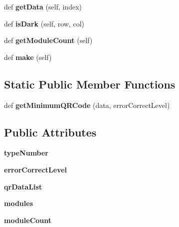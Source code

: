 \begin{DoxyCompactItemize}
def {\bfseries get\+Data} (self, index)
\item 
\mbox{\label{classqrcode_1_1_q_r_code_a6c3313700ec8fdbf1ca23549dfb6ed9f}} 
def {\bfseries is\+Dark} (self, row, col)
\item 
\mbox{\label{classqrcode_1_1_q_r_code_a30c08c963f098de1d0207755cc9e9896}} 
def {\bfseries get\+Module\+Count} (self)
\item 
\mbox{\label{classqrcode_1_1_q_r_code_af791f3139b72e1cf1dd91e3746000dd0}} 
def {\bfseries make} (self)
\end{DoxyCompactItemize}
\subsection*{Static Public Member Functions}
\begin{DoxyCompactItemize}
\item 
\mbox{\label{classqrcode_1_1_q_r_code_ac1f4af4e23403fd8f0aed43936f22b8f}} 
def {\bfseries get\+Minimum\+Q\+R\+Code} (data, error\+Correct\+Level)
\end{DoxyCompactItemize}
\subsection*{Public Attributes}
\begin{DoxyCompactItemize}
\item 
\mbox{\label{classqrcode_1_1_q_r_code_afe8d0bd0ca793d67dda14f37ae5d09dc}} 
{\bfseries type\+Number}
\item 
\mbox{\label{classqrcode_1_1_q_r_code_a50ad3a645e8734d949c8843508329e15}} 
{\bfseries error\+Correct\+Level}
\item 
\mbox{\label{classqrcode_1_1_q_r_code_a5f6c68fcb30998f3a47475fda89c57d4}} 
{\bfseries qr\+Data\+List}
\item 
\mbox{\label{classqrcode_1_1_q_r_code_a029bbfb11b143775fd15685a6e5aad8b}} 
{\bfseries modules}
\item 
\mbox{\label{classqrcode_1_1_q_r_code_a1251e5027cd04223a8ec43dd7acb002b}} 
{\bfseries module\+Count}
\end{DoxyCompactItemize}

